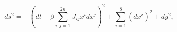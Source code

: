 \begin{equation}
\label{metgodelII}
ds^2 = - \left( dt + \beta \sum_{i,j=1}^{2n} J_{ij} x^i dx^j \right)^2
+ \sum_{i=1}^8 (dx^i)^2 + dy^2,
\end{equation}

